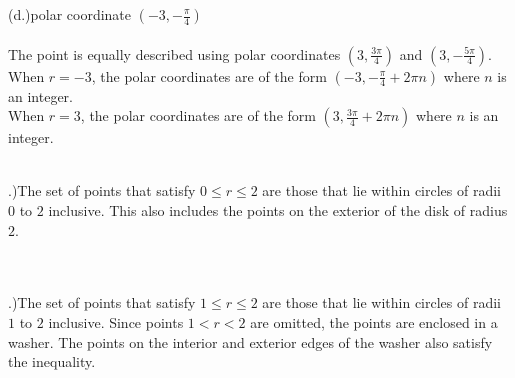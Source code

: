 \documentclass[12pt]{article}
\begin{document}
\noindent(d.)polar coordinate $(-3, -\frac{\pi}{4})$\\\\
The point is equally described using polar coordinates $(3, \frac{3\pi}{4})$ and $(3, -\frac{5\pi}{4})$.\\
When $r=-3$, the polar coordinates are of the form $(-3, -\frac{\pi}{4}+ 2\pi n)$ where $n$ is an integer.\\
When $r=3$, the polar coordinates are of the form $(3,\frac{3\pi}{4}+ 2\pi n)$ where $n$ is an integer.\\\\


\pagebreak

.)The set of points that satisfy $0 \leq r \leq 2$ are those that lie within circles of radii $0$ to $2$ inclusive.
This also includes the points on the exterior of the disk of radius $2$.\\

\\\\






.)The set of points that satisfy $1 \leq r \leq 2$ are those that lie within circles of radii $1$ to $2$ inclusive.
Since points $1 < r <  2$ are omitted, the points are enclosed in a washer.
The points on the interior and exterior edges of the washer also satisfy the inequality.\\
\end{document}
